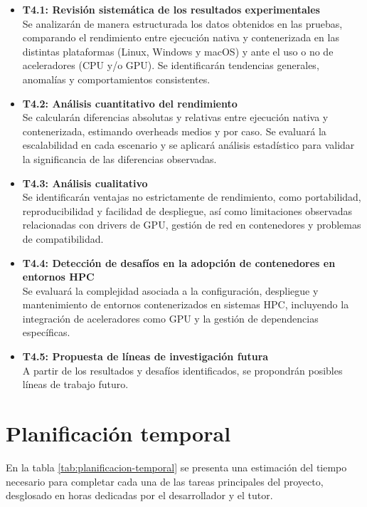 \begin{itemize}[noitemsep]
      \item \textbf{T4.1: Revisión sistemática de los resultados experimentales} \\
            Se analizarán de manera estructurada los datos obtenidos en las pruebas, comparando el rendimiento entre ejecución nativa y contenerizada en las distintas plataformas (Linux, Windows y macOS) y ante el uso o no de aceleradores (CPU y/o GPU). Se identificarán tendencias generales, anomalías y comportamientos consistentes.

      \item \textbf{T4.2: Análisis cuantitativo del rendimiento} \\
            Se calcularán diferencias absolutas y relativas entre ejecución nativa y contenerizada, estimando overheads medios y por caso. Se evaluará la escalabilidad en cada escenario y se aplicará análisis estadístico para validar la significancia de las diferencias observadas.

      \item \textbf{T4.3: Análisis cualitativo} \\
            Se identificarán ventajas no estrictamente de rendimiento, como portabilidad, reproducibilidad y facilidad de despliegue, así como limitaciones observadas relacionadas con drivers de GPU, gestión de red en contenedores y problemas de compatibilidad.

      \item \textbf{T4.4: Detección de desafíos en la adopción de contenedores en entornos HPC} \\
            Se evaluará la complejidad asociada a la configuración, despliegue y mantenimiento de entornos contenerizados en sistemas HPC, incluyendo la integración de aceleradores como GPU y la gestión de dependencias específicas.

      \item \textbf{T4.5: Propuesta de líneas de investigación futura} \\
            A partir de los resultados y desafíos identificados, se propondrán posibles líneas de trabajo futuro.
\end{itemize}

\section{Planificación temporal}

En la tabla \ref{tab:planificacion-temporal} se presenta una estimación del tiempo necesario para completar cada una de las tareas principales del proyecto, desglosado en horas dedicadas por el desarrollador y el tutor.

